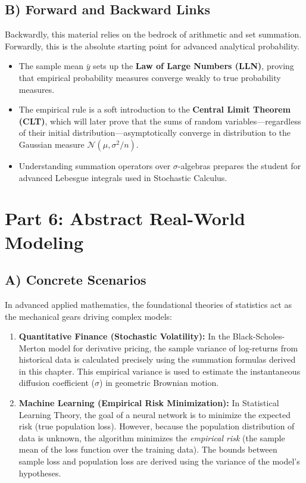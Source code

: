 \documentclass[11pt]{article}
\theoremstyle{definition}
\theoremstyle{remark}
\newcommand{\samplemean}{\bar{y}}
\begin{document}
\subsection{B) Forward and Backward Links}
Backwardly, this material relies on the bedrock of arithmetic and set summation. Forwardly, this is the absolute starting point for advanced analytical probability. 
\begin{itemize}
    \item The sample mean $\samplemean$ sets up the \textbf{Law of Large Numbers (LLN)}, proving that empirical probability measures converge weakly to true probability measures.
    \item The empirical rule is a soft introduction to the \textbf{Central Limit Theorem (CLT)}, which will later prove that the sums of random variables—regardless of their initial distribution—asymptotically converge in distribution to the Gaussian measure $\mathcal{N}(\mu, \sigma^2/n)$.
    \item Understanding summation operators over $\sigma$-algebras prepares the student for advanced Lebesgue integrals used in Stochastic Calculus.
\end{itemize}


\section{Part 6: Abstract Real-World Modeling}

\subsection{A) Concrete Scenarios}
In advanced applied mathematics, the foundational theories of statistics act as the mechanical gears driving complex models:
\begin{enumerate}
    \item \textbf{Quantitative Finance (Stochastic Volatility):} In the Black-Scholes-Merton model for derivative pricing, the sample variance of log-returns from historical data is calculated precisely using the summation formulas derived in this chapter. This empirical variance is used to estimate the instantaneous diffusion coefficient ($\sigma$) in geometric Brownian motion.
    \item \textbf{Machine Learning (Empirical Risk Minimization):} In Statistical Learning Theory, the goal of a neural network is to minimize the expected risk (true population loss). However, because the population distribution of data is unknown, the algorithm minimizes the \textit{empirical risk} (the sample mean of the loss function over the training data). The bounds between sample loss and population loss are derived using the variance of the model's hypotheses.
\end{enumerate}
\end{document}
